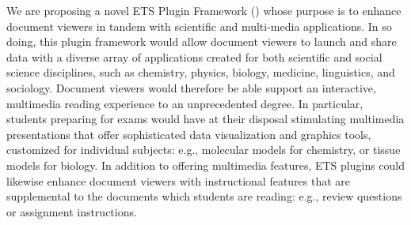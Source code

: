 \documentclass[10pt,letterpaper]{article}
\newcommand{\sectsp}{\vspace{12pt}}
\newcommand{\EPF}{\resizebox{!}{8pt}{\AcronymText{ETS{\color{pfcolor}pf}}}}
\newcommand{\ThreeD}{\resizebox{!}{8pt}{\AcronymText{3D}}}
\newcommand{\textscc}[1]{{\color{orr!35!black}{{%
						\fontfamily{Cabin-TLF}\fontseries{b}\selectfont{\textsc{\scriptsize{#1}}}}}}}
\newcommand{\AcronymText}[1]{{\textscc{#1}}}
\newcommand{\p}[1]{

\vspace{.85em}#1}
\newcommand{\llMOSAIC}{\mbox{{\LARGE MOSAIC}}}
\newcommand{\llWC}{\mbox{{\LARGE WhiteCharmDB}}}
\newcommand{\lun}[1]{\raisebox{-4pt}{\fontfamily{qcr}\selectfont{%
\LARGE{\textbf{\textcolor{tcolor}{#1}}}}}\vspace{-2pt}}
\begin{document}
	
{\linespread{1.1}\selectfont

\vspace*{-7em}

\begin{center}


\vspace{1em}


\begin{tcolorbox}
[
arc=2pt,outer arc=0pt,
enhanced jigsaw,
width=.984\textwidth,
colback=ctmpppp!30,
colframe=logoRed!30!darkRed,
drop shadow=logoPurple!50!darkRed,
]
\begin{minipage}{\textwidth}	
\begin{center}		
{\setlength{\fboxsep}{19pt}
	}
\end{center}
\end{minipage}
\end{tcolorbox}
\end{center}

\vspace{-1.5em}

\fontsize{13pt}{18pt}\selectfont
{\sectsp}
\p{We are proposing a novel ETS Plugin Framework (\EPF{}) 
whose purpose is to enhance document viewers 
in tandem with scientific and multi-media applications.
In so doing, this plugin framework would allow 
document viewers to launch and share 
data with a diverse array of applications 
created for both scientific and social science  
disciplines, such as chemistry, physics, biology, 
medicine, linguistics, and sociology. 
Document viewers would therefore be able support an 
interactive, multimedia reading 
experience to an unprecedented degree.  
In particular, students preparing for exams 
would have at their 
disposal stimulating multimedia presentations that offer sophisticated 
data visualization and \ThreeD{} graphics tools, 
customized for individual subjects: e.g., 
\ThreeD{} molecular models for chemistry, 
or \ThreeD{} tissue models for biology.
In addition to offering multimedia features,
ETS plugins could likewise enhance document viewers 
with instructional features that are 
supplemental to the documents which students 
are reading: e.g., review questions or 
assignment instructions.}

}
\end{document}
